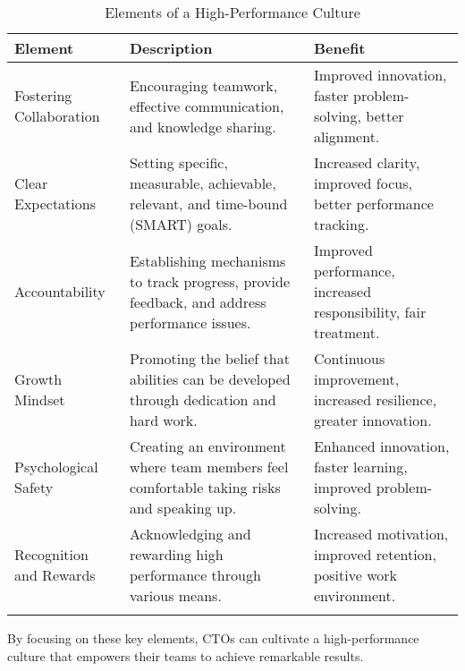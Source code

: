 \begin{longtable}{|p{4cm}|p{5cm}|p{4cm}|}
    \hline
    \textbf{Element}        & \textbf{Description}                                                                         & \textbf{Benefit}                                                     \\
    \hline
    Fostering Collaboration & Encouraging teamwork, effective communication, and knowledge sharing.                        & Improved innovation, faster problem-solving, better alignment.       \\
    \hline
    Clear Expectations      & Setting specific, measurable, achievable, relevant, and time-bound (SMART) goals.            & Increased clarity, improved focus, better performance tracking.      \\
    \hline
    Accountability          & Establishing mechanisms to track progress, provide feedback, and address performance issues. & Improved performance, increased responsibility, fair treatment.      \\
    \hline
    Growth Mindset          & Promoting the belief that abilities can be developed through dedication and hard work.       & Continuous improvement, increased resilience, greater innovation.    \\
    \hline
    Psychological Safety    & Creating an environment where team members feel comfortable taking risks and speaking up.    & Enhanced innovation, faster learning, improved problem-solving.      \\
    \hline
    Recognition and Rewards & Acknowledging and rewarding high performance through various means.                          & Increased motivation, improved retention, positive work environment. \\
    \hline
    \caption{Elements of a High-Performance Culture}
    \label{tab:high_performance_elements}                                                                                                                                                         \\
\end{longtable}

By focusing on these key elements, CTOs can cultivate a high-performance culture that empowers their teams to achieve remarkable results.
